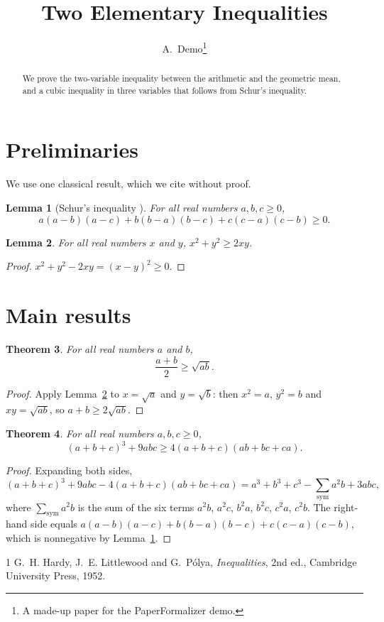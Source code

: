 \documentclass{article}
\title{Two Elementary Inequalities}
\author{A.~Demo\thanks{A made-up paper for the PaperFormalizer demo.}}
\date{}
\newtheorem{theorem}{Theorem}
\newtheorem{lemma}[theorem]{Lemma}
\begin{document}
\maketitle

\begin{abstract}
We prove the two-variable inequality between the arithmetic and the geometric mean, and a cubic
inequality in three variables that follows from Schur's inequality.
\end{abstract}

\section{Preliminaries}

We use one classical result, which we cite without proof.

\begin{lemma}[Schur's inequality {\cite[Theorem~1]{hlp}}]\label{lem:schur}
For all real numbers $a, b, c \ge 0$,
\[
  a(a-b)(a-c) + b(b-a)(b-c) + c(c-a)(c-b) \ge 0 .
\]
\end{lemma}

\begin{lemma}\label{lem:sq}
For all real numbers $x$ and $y$, $x^2 + y^2 \ge 2xy$.
\end{lemma}

\begin{proof}
$x^2 + y^2 - 2xy = (x - y)^2 \ge 0$.
\end{proof}

\section{Main results}

\begin{theorem}\label{thm:amgm}
For all real numbers $a$ and $b$,
\[
  \frac{a + b}{2} \ge \sqrt{ab} .
\]
\end{theorem}

\begin{proof}
Apply Lemma~\ref{lem:sq} to $x = \sqrt{a}$ and $y = \sqrt{b}$: then $x^2 = a$, $y^2 = b$ and
$xy = \sqrt{ab}$, so $a + b \ge 2\sqrt{ab}$.
\end{proof}

\begin{theorem}\label{thm:cubic}
For all real numbers $a, b, c \ge 0$,
\[
  (a + b + c)^3 + 9abc \ge 4(a + b + c)(ab + bc + ca) .
\]
\end{theorem}

\begin{proof}
Expanding both sides,
\[
  (a+b+c)^3 + 9abc - 4(a+b+c)(ab+bc+ca)
  = a^3 + b^3 + c^3 - \sum_{\mathrm{sym}} a^2 b + 3abc ,
\]
where $\sum_{\mathrm{sym}} a^2 b$ is the sum of the six terms $a^2 b$, $a^2 c$, $b^2 a$, $b^2 c$,
$c^2 a$, $c^2 b$. The right-hand side equals
$a(a-b)(a-c) + b(b-a)(b-c) + c(c-a)(c-b)$, which is nonnegative by Lemma~\ref{lem:schur}.
\end{proof}

\begin{thebibliography}{1}
 G.~H. Hardy, J.~E. Littlewood and G.~P\'olya, \emph{Inequalities}, 2nd ed.,
Cambridge University Press, 1952.
\end{thebibliography}
\end{document}
